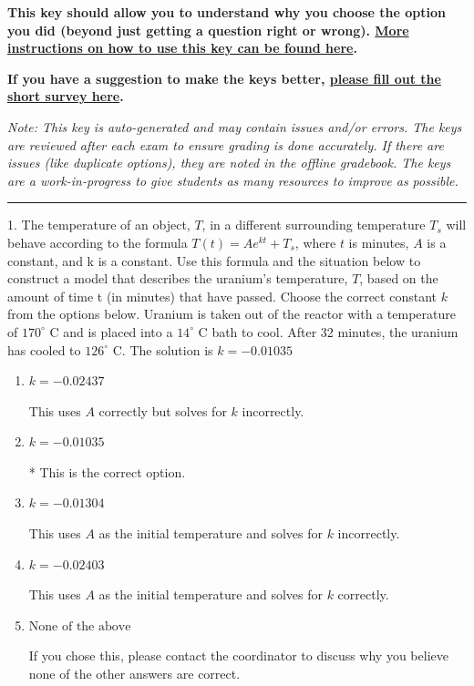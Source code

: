 \documentclass{extbook}[14pt]
\begin{document}
\textbf{This key should allow you to understand why you choose the option you did (beyond just getting a question right or wrong). \href{https://xronos.clas.ufl.edu/mac1105spring2020/courseDescriptionAndMisc/Exams/LearningFromResults}{More instructions on how to use this key can be found here}.}

\textbf{If you have a suggestion to make the keys better, \href{https://forms.gle/CZkbZmPbC9XALEE88}{please fill out the short survey here}.}

\textit{Note: This key is auto-generated and may contain issues and/or errors. The keys are reviewed after each exam to ensure grading is done accurately. If there are issues (like duplicate options), they are noted in the offline gradebook. The keys are a work-in-progress to give students as many resources to improve as possible.}

\rule{\textwidth}{0.4pt}

1. The temperature of an object, $T$, in a different surrounding temperature $T_s$ will behave according to the formula $T(t) = Ae^{kt} + T_s$, where $t$ is minutes, $A$ is a constant, and k is a constant. Use this formula and the situation below to construct a model that describes the uranium's temperature, $T$, based on the amount of time t (in minutes) that have passed. Choose the correct constant $k$ from the options below.
Uranium is taken out of the reactor with a temperature of $170^{\circ}$ C and is placed into a $14^{\circ}$ C bath to cool. After 32 minutes, the uranium has cooled to $126^{\circ}$ C. 
The solution is $ k = -0.01035 $ 

\begin{enumerate}[label=\Alph*.] 
\item $ k = -0.02437 $ 

 This uses $A$ correctly but solves for $k$ incorrectly. 
\item $ k = -0.01035 $ 

 * This is the correct option. 
\item $ k = -0.01304 $ 

 This uses $A$ as the initial temperature and solves for $k$ incorrectly. 
\item $ k = -0.02403 $ 

 This uses $A$ as the initial temperature and solves for $k$ correctly. 
\item $ \text{None of the above} $ 

 If you chose this, please contact the coordinator to discuss why you believe none of the other answers are correct. 
\end{enumerate} 
 
\end{document}
